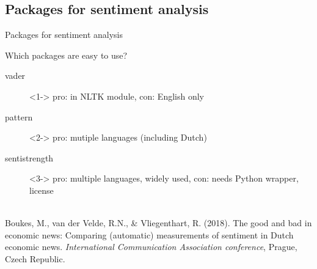 \documentclass{beamer}
\begin{document}
\subsection{Packages for sentiment analysis}

\begin{frame}[plain]
Packages for sentiment analysis
\end{frame}


\begin{frame}{Which packages are easy to use?}
	
\begin{description}
	\item[vader]<1-> pro: in NLTK module, con: English only
	\item[pattern]<2-> pro: mutiple languages (including Dutch)
	\item[sentistrength]<3-> pro: multiple languages, widely used, con: needs Python wrapper, license
	
\end{description}




\end{frame}


\begin{frame}%
\\
\tiny
Boukes, M., van der Velde, R.N., \& Vliegenthart, R. (2018). The good and bad in economic news: Comparing (automatic) measurements of sentiment in Dutch economic news. \emph{International Communication Association conference}, Prague, Czech Republic.
\end{frame}
\end{document}
